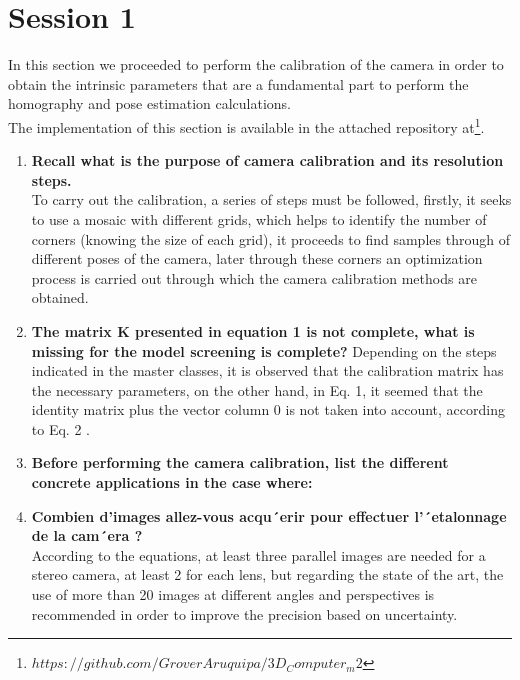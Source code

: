 \documentclass[12pt, twoside]{report}
\begin{document}
\pagebreak



    


\chapter{Session 1}
In this section we proceeded to perform the calibration of the camera in order to obtain the intrinsic parameters that are a fundamental part to perform the homography and pose estimation calculations.\\
The implementation of this section is available in the attached repository at\footnote{\href{https://github.com/GroverAruquipa/3D_Computer_m2}{$https://github.com/GroverAruquipa/3D_Computer_m2$}}.
\begin{enumerate}
    \item \textbf{Recall what is the purpose of camera calibration and its resolution steps.}\\
    To carry out the calibration, a series of steps must be followed, firstly, it seeks to use a mosaic with different grids, which helps to identify the number of corners (knowing the size of each grid), it proceeds to find samples through of different poses of the camera, later through these corners an optimization process is carried out through which the camera calibration methods are obtained.
    \item{\textbf{The matrix K presented in equation 1 is not complete, what is missing for the model
screening is complete?}}
    Depending on the steps indicated in the master classes, it is observed that the calibration matrix has the necessary parameters, on the other hand, in Eq. 1, it seemed that the identity matrix plus the vector column 0 is not taken into account, according to Eq. 2 .
    \item{\textbf{Before performing the camera calibration, list the different concrete applications in the
case where:}}
    \item{\textbf{Combien d’images allez-vous acqu´erir pour effectuer l’´etalonnage de la cam´era ?}}\\
    According to the equations, at least three parallel images are needed for a stereo camera, at least 2 for each lens, but regarding the state of the art, the use of more than 20 images at different angles and perspectives is recommended in order to improve the precision based on uncertainty.
    

\end{enumerate}
\end{document}
